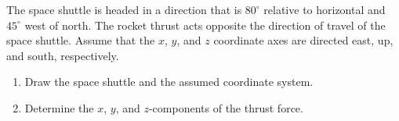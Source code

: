 
The space shuttle is headed in a direction that is $80^\circ$ relative to horizontal and $45^\circ$ west of north. The rocket thrust acts opposite the direction of travel of the space shuttle. Assume that the $x$, $y$, and $z$ coordinate axes are directed east, up, and south, respectively. 
\begin{enumerate}
  \item Draw the space shuttle and the assumed coordinate system.
  \item Determine the $x$, $y$, and $z$-components of the thrust force.
\end{enumerate}



